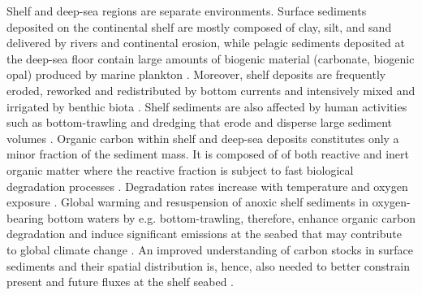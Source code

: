 \documentclass[journal abbreviation, manuscript]{copernicus}
\begin{document}
Shelf and deep-sea regions are separate environments. Surface sediments deposited on the continental shelf are mostly composed of clay, silt, and sand delivered by rivers and continental erosion, while pelagic sediments deposited at the deep-sea floor contain large amounts of biogenic material (carbonate, biogenic opal) produced by marine plankton \citep{bernerAndBerner2012}. Moreover, shelf deposits are frequently eroded, reworked and redistributed by bottom currents and intensively mixed and irrigated by benthic biota \citep{ALLER1998143, boudreau1997diagenetic, song2022global}. Shelf sediments are also affected by human activities such as bottom-trawling and dredging that erode and disperse large sediment volumes \citep{Sala2021}. Organic carbon within shelf and deep-sea deposits constitutes only a minor fraction of the sediment mass. It is composed of of both reactive and inert organic matter where the reactive fraction is subject to fast biological degradation processes \citep{Hiddink2023}. Degradation rates increase with temperature and oxygen exposure \citep{ARNDT201353, HEDGES199581}. Global warming and resuspension of anoxic shelf sediments in oxygen-bearing bottom waters by e.g. bottom-trawling, therefore, enhance organic carbon degradation and induce significant  emissions at the seabed that may contribute to global climate change \citep{Hiddink2023, Sala2021}. An improved understanding of carbon stocks in surface sediments and their spatial distribution is, hence, also needed to better constrain present and future  fluxes at the shelf seabed \citep{atwood2020}.
\end{document}
